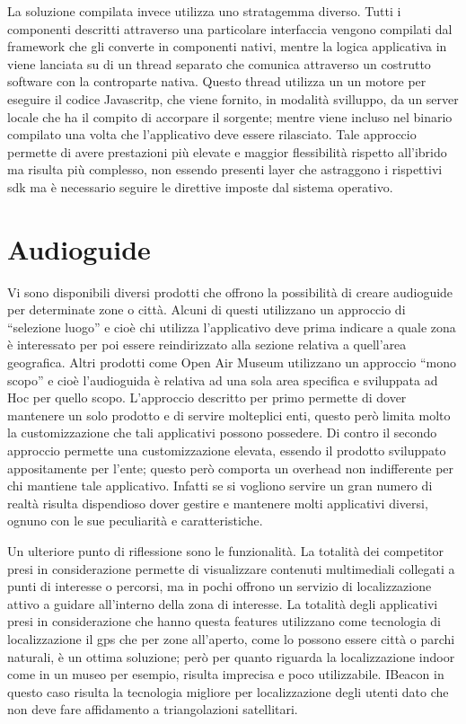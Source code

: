 La soluzione compilata invece utilizza uno stratagemma diverso. Tutti i componenti descritti attraverso una particolare interfaccia vengono compilati dal framework che gli converte in componenti nativi, mentre la logica applicativa in viene lanciata su di un thread separato che comunica attraverso un costrutto software con la controparte nativa. Questo thread utilizza un un motore per eseguire il codice Javascritp, che viene fornito, in modalità svilluppo, da un server locale che ha il compito di accorpare il sorgente; mentre viene incluso nel binario compilato una volta che l'applicativo deve essere rilasciato. Tale approccio permette di avere prestazioni più elevate e maggior flessibilità rispetto all'ibrido ma risulta più complesso, non essendo presenti layer che astraggono i rispettivi sdk ma è necessario seguire le direttive imposte dal sistema operativo.


\section{Audioguide}\vspace{5mm}

Vi sono disponibili diversi prodotti che offrono la possibilità di creare audioguide per determinate zone o città. Alcuni di questi utilizzano un approccio di “selezione luogo” e cioè chi utilizza l’applicativo deve prima indicare a quale zona è interessato per poi essere reindirizzato alla sezione relativa a quell’area geografica. Altri prodotti come Open Air Museum utilizzano un approccio “mono scopo” e cioè l’audioguida è relativa ad una sola area specifica e sviluppata ad Hoc per quello scopo. L’approccio descritto per primo permette di dover mantenere un solo prodotto e di servire molteplici enti, questo però limita molto la customizzazione che tali applicativi possono possedere. Di contro il secondo approccio permette una customizzazione elevata, essendo il prodotto sviluppato appositamente per l’ente; questo però comporta un overhead non indifferente per chi mantiene tale applicativo. Infatti se si vogliono servire un gran numero di realtà risulta dispendioso dover gestire e mantenere molti applicativi diversi, ognuno con le sue peculiarità e caratteristiche.\vspace{5mm}

Un ulteriore punto di riflessione sono le funzionalità. La totalità dei competitor presi in considerazione permette di visualizzare contenuti multimediali collegati a punti di interesse o percorsi, ma in pochi offrono un servizio di localizzazione attivo a guidare all’interno della zona di interesse. La totalità degli applicativi presi in considerazione che hanno questa features utilizzano come tecnologia di localizzazione il gps che per zone all’aperto, come lo possono essere città o parchi naturali, è un ottima soluzione; però per quanto riguarda la localizzazione indoor come in un museo per esempio, risulta imprecisa e poco utilizzabile. IBeacon in questo caso risulta la tecnologia migliore per localizzazione degli utenti dato che non deve fare affidamento a triangolazioni satellitari.\vspace{5mm}

